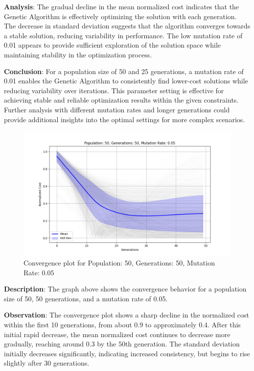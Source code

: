 \documentclass[
]{article}
\begin{document}
    \textbf{Analysis}: The gradual decline in the mean normalized cost indicates that the Genetic Algorithm is effectively optimizing the solution with each generation. The decrease in standard deviation suggests that the algorithm converges towards a stable solution, reducing variability in performance. The low mutation rate of 0.01 appears to provide sufficient exploration of the solution space while maintaining stability in the optimization process.

    \textbf{Conclusion}: For a population size of 50 and 25 generations, a mutation rate of 0.01 enables the Genetic Algorithm to consistently find lower-cost solutions while reducing variability over iterations. This parameter setting is effective for achieving stable and reliable optimization results within the given constraints. Further analysis with different mutation rates and longer generations could provide additional insights into the optimal settings for more complex scenarios.

    \begin{figure}[H]
        \centering
        \includegraphics[width=\textwidth]{genetic_algorithm/Population_50_Generations_50_MutationRate_0.05}
        \caption{Convergence plot for Population: 50, Generations: 50, Mutation Rate: 0.05}
        \label{fig:ga_50_50_05}
    \end{figure}

    \textbf{Description}: The graph above shows the convergence behavior for a population size of 50, 50 generations, and a mutation rate of 0.05.

    \textbf{Observation}: The convergence plot shows a sharp decline in the normalized cost within the first 10 generations, from about 0.9 to approximately 0.4. After this initial rapid decrease, the mean normalized cost continues to decrease more gradually, reaching around 0.3 by the 50th generation. The standard deviation initially decreases significantly, indicating increased consistency, but begins to rise slightly after 30 generations.
\end{document}
